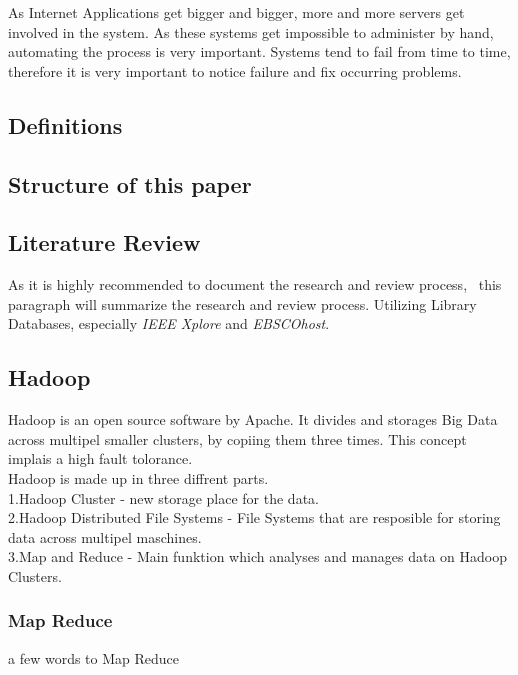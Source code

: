As Internet Applications get bigger and bigger, more and more servers get involved in the system. As these systems get impossible to administer by hand, automating the process is very important. Systems tend to fail from time to time, therefore it is very important to notice failure and fix occurring problems.


\subsection{Definitions}

\subsection{Structure of this paper}
\subsection{Literature Review}
	As it is highly recommended to document the research and review process,~\cite{brocke09} this paragraph will summarize the research and review process.
	Utilizing Library Databases, especially \emph{IEEE Xplore} and \emph{EBSCOhost}.
	
\subsection{Hadoop}
Hadoop is an open source software by Apache. It divides and storages Big Data across multipel smaller clusters, by copiing them three times. This concept implais a high fault tolorance. 
 \\
 Hadoop is made up in three diffrent parts. 
  \\
  1.Hadoop Cluster - new storage place for the data.
  \\
  2.Hadoop Distributed File Systems - File Systems that are resposible for storing data across multipel maschines.
  \\
  3.Map and Reduce - Main funktion which analyses and manages data on Hadoop Clusters.
\subsubsection*{Map Reduce}
a few words to Map Reduce
